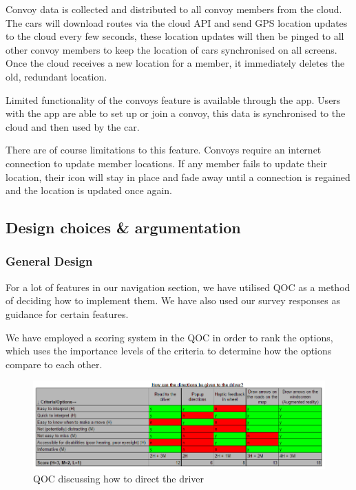 \documentclass{article}
\begin{document}
Convoy data is collected and distributed to all convoy members from the cloud. The cars will download routes via the cloud API and send GPS location updates to the cloud every few seconds, these location updates will then be pinged to all other convoy members to keep the location of cars synchronised on all screens. Once the cloud receives a new location for a member, it immediately deletes the old, redundant location.

Limited functionality of the convoys feature is available through the app. Users with the app are able to set up or join a convoy, this data is synchronised to the cloud and then used by the car.

There are of course limitations to this feature. Convoys require an internet connection to update member locations. If any member fails to update their location, their icon will stay in place and fade away until a connection is regained and the location is updated once again.

\subsection{Design choices \& argumentation}\label{ssec:nav-design}
\subsubsection{General Design}\label{sssec:nav-design-general}
For a lot of features in our navigation section, we have utilised QOC as a method of deciding how to implement them. We have also used our survey responses as guidance for certain features.

We have employed a scoring system in the QOC in order to rank the options, which uses the importance levels of the criteria to determine how the options compare to each other.

\begin{figure}[H]
  \centering
  \includegraphics[width=\linewidth]{qoc-nav-instruction}
  \caption{QOC discussing how to direct the driver}\label{qoc-instructions}
\end{figure}
\end{document}
